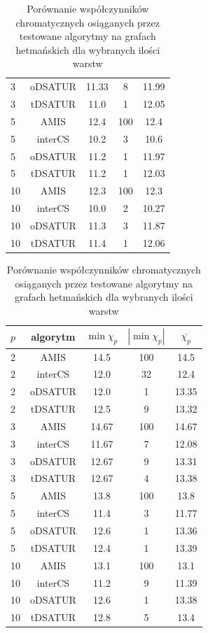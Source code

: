 \documentclass[10pt,a4paper]{article}
\begin{document}
\begin{table}[H]
\begin{minipage}{.5\linewidth}
\begin{tabular}{|l|c|c|c|c|}
				3 & oDSATUR & 11.33 & 8 & 11.99 \\
				3 & tDSATUR & 11.0 & 1 & 12.05 \\
				\hline
				5 & AMIS & 12.4 & 100 & 12.4 \\
				5 & interCS & 10.2 & 3 & 10.6 \\
				5 & oDSATUR & 11.2 & 1 & 11.97 \\
				5 & tDSATUR & 11.2 & 1 & 12.03 \\
				\hline
				10 & AMIS & 12.3 & 100 & 12.3 \\
				10 & interCS & 10.0 & 2 & 10.27 \\
				10 & oDSATUR & 11.3 & 3 & 11.87 \\
				10 & tDSATUR & 11.4 & 1 & 12.06 \\
				\hline
			\end{tabular}
			\caption{$Q(9)$}
		\end{minipage}
		\begin{minipage}{.5\linewidth}
			\centering
			\begin{tabular}{|l|c|c|c|c|}
				\hline
				\textbf{$p$} & \textbf{algorytm} & \textbf{$\min \chi_{p}$} & \textbf{$|\min \chi_{p}|$} & \textbf{$\overline{\chi_{p}}$} \\
				\hline
				2 & AMIS & 14.5 & 100 & 14.5 \\
				2 & interCS & 12.0 & 32 & 12.4 \\
				2 & oDSATUR & 12.0 & 1 & 13.35 \\
				2 & tDSATUR & 12.5 & 9 & 13.32 \\
				\hline
				3 & AMIS & 14.67 & 100 & 14.67 \\
				3 & interCS & 11.67 & 7 & 12.08 \\
				3 & oDSATUR & 12.67 & 9 & 13.31 \\
				3 & tDSATUR & 12.67 & 4 & 13.38 \\
				\hline
				5 & AMIS & 13.8 & 100 & 13.8 \\
				5 & interCS & 11.4 & 3 & 11.77 \\
				5 & oDSATUR & 12.6 & 1 & 13.36 \\
				5 & tDSATUR & 12.4 & 1 & 13.39 \\
				\hline
				10 & AMIS & 13.1 & 100 & 13.1 \\
				10 & interCS & 11.2 & 9 & 11.39 \\
				10 & oDSATUR & 12.6 & 1 & 13.38 \\
				10 & tDSATUR & 12.8 & 5 & 13.4 \\
				\hline
			\end{tabular}
			\caption{$Q(10)$}
		\end{minipage}
		\caption{Porównanie współczynników chromatycznych osiąganych przez testowane algorytmy na grafach hetmańskich dla wybranych ilości warstw }
	\end{table}
\end{document}
